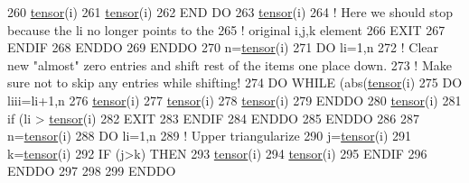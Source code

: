 \begin{DoxyCode}
260                   \hyperlink{namespacetensor}{tensor}(i)%
261                   \hyperlink{namespacetensor}{tensor}(i)%
262 \textcolor{keywordflow}{               END DO}
263                \hyperlink{namespacetensor}{tensor}(i)%
264                \textcolor{comment}{! Here we should stop because the li no longer points to the}
265                \textcolor{comment}{! original i,j,k element}
266                \textcolor{keywordflow}{EXIT}
267 \textcolor{keywordflow}{            ENDIF}
268 \textcolor{keywordflow}{         ENDDO}
269 \textcolor{keywordflow}{      ENDDO}
270       n=\hyperlink{namespacetensor}{tensor}(i)%
271       \textcolor{keywordflow}{DO} li=1,n
272          \textcolor{comment}{! Clear new "almost" zero entries and shift rest of the items one place down.}
273          \textcolor{comment}{! Make sure not to skip any entries while shifting!}
274          \textcolor{keywordflow}{DO} \textcolor{keywordflow}{WHILE} (abs(\hyperlink{namespacetensor}{tensor}(i)%
275             \textcolor{keywordflow}{DO} liii=li+1,n
276                \hyperlink{namespacetensor}{tensor}(i)%
277                \hyperlink{namespacetensor}{tensor}(i)%
278                \hyperlink{namespacetensor}{tensor}(i)%
279 \textcolor{keywordflow}{            ENDDO}
280             \hyperlink{namespacetensor}{tensor}(i)%
281             \textcolor{keywordflow}{if} (li > \hyperlink{namespacetensor}{tensor}(i)%
282                \textcolor{keywordflow}{EXIT}
283 \textcolor{keywordflow}{            ENDIF}
284 \textcolor{keywordflow}{         ENDDO}
285 \textcolor{keywordflow}{      ENDDO}
286 
287       n=\hyperlink{namespacetensor}{tensor}(i)%
288       \textcolor{keywordflow}{DO} li=1,n
289          \textcolor{comment}{! Upper triangularize}
290          j=\hyperlink{namespacetensor}{tensor}(i)%
291          k=\hyperlink{namespacetensor}{tensor}(i)%
292          \textcolor{keywordflow}{IF} (j>k) \textcolor{keywordflow}{THEN}
293             \hyperlink{namespacetensor}{tensor}(i)%
294             \hyperlink{namespacetensor}{tensor}(i)%
295 \textcolor{keywordflow}{         ENDIF}
296 \textcolor{keywordflow}{      ENDDO}
297 
298 
299 \textcolor{keywordflow}{   ENDDO}
\end{DoxyCode}
